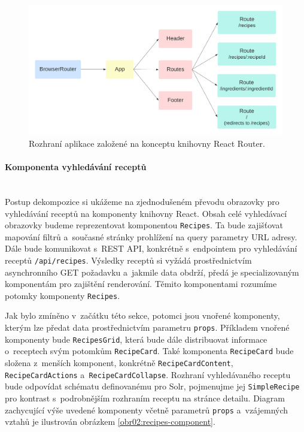 \begin{figure}[h!]\centering
\includegraphics[width=140mm]{../img/react-app}
\caption{Rozhraní aplikace založené na konceptu knihovny React Router.}
\label{obr02:react-app}
\end{figure}

\paragraph{Komponenta vyhledávání receptů}\mbox{}\\

Postup dekompozice si ukážeme na zjednodušeném převodu obrazovky pro vyhledávání receptů na komponenty knihovny React. Obsah celé vyhledávací obrazovky budeme reprezentovat komponentou \texttt{Recipes}. Ta bude zajišťovat mapování filtrů a~současné stránky prohlížení na query parametry URL adresy. Dále bude komunikovat s~REST API, konkrétně s~endpointem pro vyhledávání receptů \texttt{/api/recipes}. Výsledky receptů si vyžádá prostřednictvím asynchronního GET požadavku a~jakmile data obdrží, předá je specializovaným komponentám pro zajištění renderování. Těmito komponentami rozumíme potomky komponenty \texttt{Recipes}.

Jak bylo zmíněno v~začátku této sekce, potomci jsou vnořené komponenty, kterým lze předat data prostřednictvím parametru \texttt{props}. Příkladem vnořené komponenty bude \texttt{RecipesGrid}, která bude dále distribuovat informace o~receptech svým potomkům \texttt{RecipeCard}. Také komponenta \texttt{RecipeCard} bude složena z~menších komponent, konkrétně \texttt{RecipeCardContent}, \texttt{RecipeCardActions} a~\texttt{RecipeCardCollapse}. Rozhraní vyhledávaného receptu bude odpovídat schématu definovanému pro Solr, pojmenujme jej \texttt{SimpleRecipe} pro kontrast s~podrobnějším rozhraním receptu na stránce detailu. Diagram zachycující výše uvedené komponenty včetně parametrů \texttt{props} a~vzájemných vztahů je ilustrován obrázkem \ref{obr02:recipes-component}.

